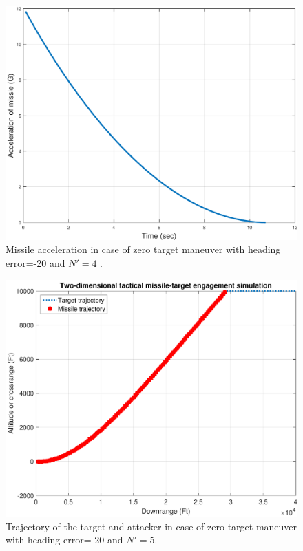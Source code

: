 \begin{figure}[H]
	\centering
	\includegraphics[scale = 0.57]{fig/MissileAccelerationXNT0HE20N4.pdf}
	\caption{Missile acceleration in case of zero target maneuver with heading error=-20 and $N'=4$ .}
	\label{missile acceleration20N4}
\end{figure}


\begin{figure}[H]
	\centering
	\includegraphics[scale = 0.57]{fig/trajectoryXNT0HE20N5.pdf}
	\caption{Trajectory of the target and attacker in case of zero target maneuver with heading error=-20 and $N'=5$.}
	\label{trajectory20N5}
\end{figure}


